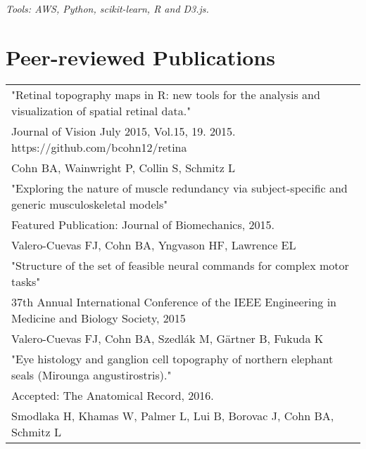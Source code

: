 \documentclass[10pt,a4paper]{article}
\begin{document}
  \vspace*{2mm}\setlength\parindent{2mm}\begin{minipage}{16.8cm}
    \textit{Tools: AWS, Python, scikit-learn, R and D3.js.} 
  \end{minipage}

  \vspace*{3mm}\section*{Peer-reviewed Publications}

  \vspace*{1mm}\begin{tabularx}{17cm}{X}
    "Retinal topography maps in R: new tools for the analysis and visualization of spatial retinal data." \\
    Journal of Vision July 2015, Vol.15, 19.  2015. https://github.com/bcohn12/retina \\
    Cohn BA, Wainwright P, Collin S, Schmitz L \\[2mm]

    "Exploring the nature of muscle redundancy via subject-specific and generic musculoskeletal models" \\
    Featured Publication: Journal of Biomechanics, 2015. \\
    Valero-Cuevas FJ, Cohn BA, Yngvason HF, Lawrence EL \\[2mm]

    "Structure of the set of feasible neural commands for complex motor tasks" \\
    37th Annual International Conference of the IEEE Engineering in Medicine and Biology Society, 2015 \\
    Valero-Cuevas FJ, Cohn BA, Szedl\'{a}k M, G{\"a}rtner B, Fukuda K \\[2mm]

    "Eye histology and ganglion cell topography of northern elephant seals (Mirounga angustirostris)." \\
    Accepted: The Anatomical Record, 2016. \\
    Smodlaka H, Khamas W, Palmer L, Lui B, Borovac J, Cohn BA, Schmitz L \\[2mm]
    
  \end{tabularx}
\end{document}
